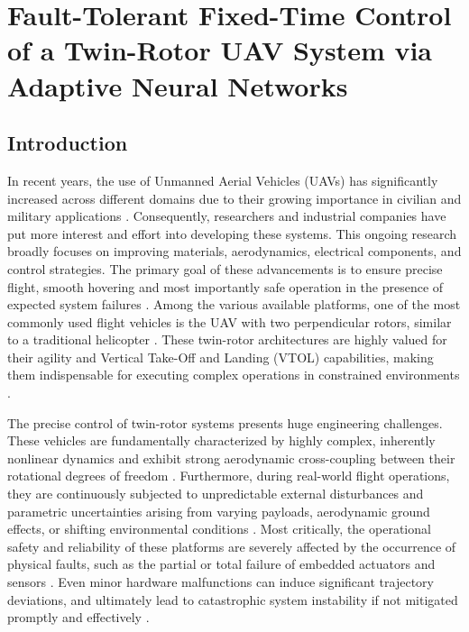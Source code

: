 
\chapter{Fault-Tolerant Fixed-Time Control of a Twin-Rotor UAV System via Adaptive Neural Networks}
\label{chp3}


\section{Introduction}

In recent years, the use of Unmanned Aerial Vehicles (UAVs) has significantly increased across different domains due to their growing importance in civilian and military applications \cite{UAV_rev, UAV_rev1, Valavanis2015}. Consequently, researchers and industrial companies have put more interest and effort into developing these systems. This ongoing research broadly focuses on improving materials, aerodynamics, electrical components, and control strategies. The primary goal of these advancements is to ensure precise flight, smooth hovering and most importantly safe operation in the presence of expected system failures \cite{Steinberg2021, Zhang2008}. Among the various available platforms, one of the most commonly used flight vehicles is the UAV with two perpendicular rotors, similar to a traditional helicopter \cite{trms_review1, Rahideh2008}. These twin-rotor architectures are highly valued for their agility and Vertical Take-Off and Landing (VTOL) capabilities, making them indispensable for executing complex operations in constrained environments \cite{trms1}.

The precise control of twin-rotor systems presents huge engineering challenges. These vehicles are fundamentally characterized by highly complex, inherently nonlinear dynamics and exhibit strong aerodynamic cross-coupling between their rotational degrees of freedom \cite{NonlinearCoupledDynamics1, trms2}. Furthermore, during real-world flight operations, they are continuously subjected to unpredictable external disturbances and parametric uncertainties arising from varying payloads, aerodynamic ground effects, or shifting environmental conditions \cite{ExternalDisturbances1, ExternalDisturbances2}. Most critically, the operational safety and reliability of these platforms are severely affected by the occurrence of physical faults, such as the partial or total failure of embedded actuators and sensors \cite{Isermann2011, ftc_UAV_review2}. Even minor hardware malfunctions can induce significant trajectory deviations, and ultimately lead to catastrophic system instability if not mitigated promptly and effectively \cite{Steinberg2021, Zhang2008}.

